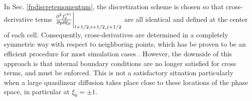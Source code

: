                       

\label{crossderivativesappendix} In Sec. \ref{fpdiscretemomentum}, the
discretization scheme is chosen so that cross-derivative terms $\left. \frac{%
\partial ^{2}f_{0}^{\left( 0\right) }}{\partial p\partial \xi _{0}}%
\right\vert _{l+1/2,i+1/2,j+1/2}$ are all identical and defined at the
center of each cell. Consequently, cross-derivatives are determined in a
completely symmetric way with respect to neighboring points, which has be
proven to be an efficient procedure for most simulation cases \cite{sho94}.
However, the downside of this approach is that internal boundary conditions
are no longer satisfied for cross terms, and must be enforced. This is not a
satisfactory situation particularly when a large quasilinear diffusion takes
place close to these locations of the phase space, in particular at $\xi
_{0}=\pm 1.$

